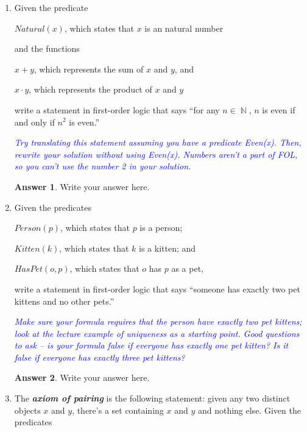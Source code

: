 \documentclass[a4paper]{article}
\renewcommand{\(}{\left(}
\renewcommand{\)}{\right)}
\DeclareMathOperator{\N}{\mathds{N}}
\theoremstyle{plain}
\theoremstyle{plain}
\theoremstyle{definition}
\newtheorem*{answer}{Answer}
\begin{document}
\begin{enumerate}[label*=\roman*.,ref=\roman*]
\item Given the predicate

\qquad $\textit{Natural}(x)$,
which states that $x$ is an natural number

and the functions

\qquad $x + y$, which represents the sum of $x$ and $y$, and

\qquad $x \cdot y$, which represents the product of $x$ and $y$

write a statement in first-order logic that says
``for any $n \in \N$, $n$ is even if and only if
$n^2$ is even.''

\textit{\textcolor{blue}{Try translating this statement assuming you have a predicate Even(x). Then, rewrite your solution without
using Even(x). Numbers aren't a part of FOL, so you can't use the number 2 in your solution.}}

\begin{shaded}
\begin{answer}
Write your answer here.
\end{answer}
\end{shaded}
\item Given the predicates

\qquad $\textit{Person}(p)$,
which states that $p$ is a person;

\qquad $\textit{Kitten}(k)$,
which states that $k$ is a kitten; and

\qquad $\textit{HasPet}(o, p)$,
which states that $o$ has $p$ as a pet,

write a statement in first-order logic that says
``someone has exactly two pet kittens and no other
pets.''

\textit{\textcolor{blue}{ Make sure your formula requires that the person
have \textit{exactly} two pet kittens; look at the lecture example of
uniqueness as a starting point. Good questions to ask --
is your formula false if everyone has exactly one pet
kitten? Is it false if everyone has exactly three pet kittens? }}
\begin{shaded}
\begin{answer}
Write your answer here.
\end{answer}
\end{shaded}
\item The \textbf{\textit{axiom of pairing}}
is the following statement:
given any two distinct objects $x$ and $y$,
there's a set containing $x$ and $y$ and nothing else.
Given the predicates


\end{enumerate}
\end{document}
